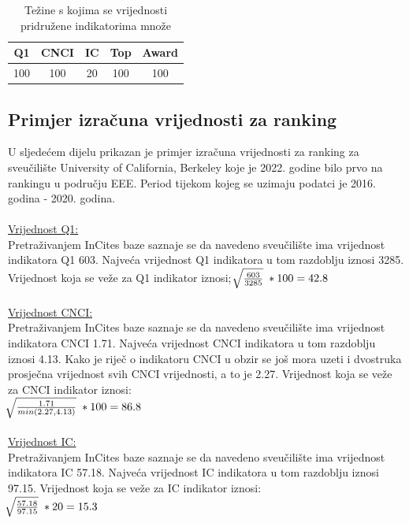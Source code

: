 \documentclass[times, utf8, zavrsni]{fer}
\begin{document}
\begin{table}[htb]
    \caption{Težine s kojima se vrijednosti pridružene indikatorima množe}
        \label{tbl:konstante3}
        \centering
        \begin{tabular}{ccccc} \hline
        Q1 & CNCI & IC & Top & Award \\ \hline
        100&100&20&100&100\\
        \end{tabular}
        \end{table}    
        \FloatBarrier


\subsection{Primjer izračuna vrijednosti za ranking}
U sljedećem dijelu prikazan je primjer izračuna vrijednosti za ranking za sveučilište University of California, Berkeley koje je 2022. godine bilo prvo na rankingu u području EEE.
Period tijekom kojeg se uzimaju podatci je 2016. godina - 2020. godina.
\\
\\ \underline{Vrijednost Q1:} 
\\ Pretraživanjem InCites baze saznaje se da navedeno sveučilište ima vrijednost indikatora Q1 603. Najveća vrijednost Q1 indikatora u tom razdoblju iznosi 3285.
Vrijednost koja se veže za Q1 indikator iznosi;  \; $\sqrt[\leftroot{-2}]{\frac{603}{3285}} \; * 100 = 42.8$
\\
\\ \underline{Vrijednost CNCI:} 
\\ Pretraživanjem InCites baze saznaje se da navedeno sveučilište ima vrijednost indikatora CNCI 1.71. Najveća vrijednost CNCI indikatora u tom razdoblju iznosi 4.13.
Kako je riječ o indikatoru CNCI u obzir se još mora uzeti i dvostruka prosječna vrijednost svih CNCI vrijednosti, a to je 2.27.
Vrijednost koja se veže za CNCI indikator iznosi: \; \\ $\sqrt[\leftroot{-2}]{\frac{1.71}{min(2.27, 4.13)}} \; * 100 = 86.8$
\\
\\ \underline{Vrijednost IC:} 
\\ Pretraživanjem InCites baze saznaje se da navedeno sveučilište ima vrijednost indikatora IC 57.18. Najveća vrijednost IC indikatora u tom razdoblju iznosi 97.15.
Vrijednost koja se veže za IC indikator iznosi: \; \\ $\sqrt[\leftroot{-2}]{\frac{57.18}{97.15}} \; * 20 = 15.3$
\\
\end{document}

